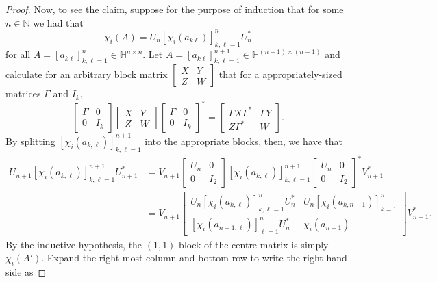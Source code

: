 \documentclass[11pt,reqno]{amsart}
\def\x{\chi}
\def\NN{\mathbb{N}}
\def\HH{\mathbb{H}}
\theoremstyle{definition}
\numberwithin{equation}{section}
\begin{document}
\begin{proof}
    Now, to see the claim, suppose for the purpose of induction that for some \(n \in \NN\) we had that
    \[
        \x_i(A) = U_n [\x_i(a_{k\ell})]_{k,\ell=1}^n U_n^*
    \]
    for all \(A = [a_{k\ell}]_{k,\ell=1}^n \in \HH^{n\times n}\). Let \(A = [a_{k\ell}]_{k,\ell=1}^{n+1} \in \HH^{(n+1)\times(n+1)}\) and calculate for an arbitrary block matrix \(\begin{bmatrix} X & Y \\ Z & W \end{bmatrix}\) that for a appropriately-sized matrices \(\Gamma\) and \(I_k\),
    \[
        \begin{bmatrix} \Gamma & 0 \\ 0 & I_k \end{bmatrix} \begin{bmatrix} X & Y \\ Z & W \end{bmatrix} \begin{bmatrix} \Gamma & 0 \\ 0 & I_k\end{bmatrix}^* = \begin{bmatrix} \Gamma X \Gamma^* & \Gamma Y \\ Z \Gamma^* & W \end{bmatrix}.
    \]
    By splitting \([\x_i(a_{k,\ell})]_{k,\ell=1}^{n+1}\) into the appropriate blocks, then, we have that
    \begin{equation}
    \label{eq:UnitaryEquivLemma}
        \begin{split}
            U_{n+1} [\x_i(a_{k,\ell})]_{k,\ell=1}^{n+1} U_{n+1}^* & = V_{n+1} \begin{bmatrix} U_n & 0 \\ 0 & I_2 \end{bmatrix} [\x_i(a_{k,\ell})]_{k,\ell=1}^{n+1} \begin{bmatrix} U_n & 0 \\ 0 & I_2 \end{bmatrix}^* V_{n+1}^* \\
            & = V_{n+1} \begin{bmatrix} U_n [\x_i(a_{k,\ell})]_{k,\ell=1}^n U_n^* & U_n [\x_i(a_{k,n+1})]_{k=1}^n \\[6pt] [\x_i(a_{n+1,\ell})]_{\ell=1}^n U_n^* & \x_i(a_{n+1}) \end{bmatrix} V_{n+1}^*. 
        \end{split}
    \end{equation}
    By the inductive hypothesis, the \((1,1)\)-block of the centre matrix is simply \(\x_i(A')\). Expand the right-most column and bottom row to write the right-hand side as

\end{proof}
\end{document}
